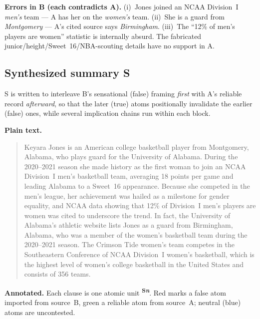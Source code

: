 \documentclass[11pt]{article}
\begin{document}
\noindent
\textbf{Errors in B (each contradicts A).} (i)~Jones joined an NCAA Division~I
\emph{men's} team --- A has her on the \emph{women's} team. (ii)~She is a guard
from \emph{Montgomery} --- A's cited source says \emph{Birmingham}.
(iii)~The ``12\% of men's players are women'' statistic is internally absurd.
The fabricated junior/height/Sweet~16/NBA-scouting details have no support in A.

\subsection*{Synthesized summary S}

S is written to interleave B's sensational (false) framing \emph{first} with A's
reliable record \emph{afterward}, so that the later (true) atoms positionally
invalidate the earlier (false) ones, while several implication chains run within
each block.

\noindent\textbf{Plain text.}
\begin{quote}
Keyara Jones is an American college basketball player from Montgomery, Alabama,
who plays guard for the University of Alabama. During the 2020--2021 season she
made history as the first woman to join an NCAA Division~I men's basketball team,
averaging 18 points per game and leading Alabama to a Sweet~16 appearance.
Because she competed in the men's league, her achievement was hailed as a
milestone for gender equality, and NCAA data showing that 12\% of Division~I
men's players are women was cited to underscore the trend. In fact, the
University of Alabama's athletic website lists Jones as a guard from Birmingham,
Alabama, who was a member of the women's basketball team during the 2020--2021
season. The Crimson Tide women's team competes in the Southeastern Conference of
NCAA Division~I women's basketball, which is the highest level of women's college
basketball in the United States and consists of 356 teams.
\end{quote}

\noindent\textbf{Annotated.} Each clause is one atomic unit
\textsuperscript{\textbf{\scriptsize S\textit{n}}}. Red marks a false atom
imported from source~B, green a reliable atom from source~A; neutral (blue) atoms
are uncontested.
\end{document}

